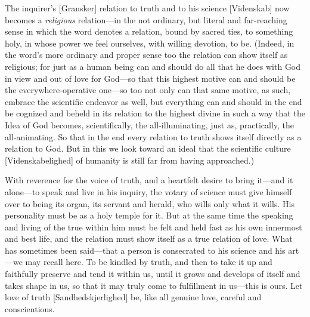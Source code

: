 \documentclass[12pt,a4paper]{book}
\begin{document}
The inquirer's [Gransker] relation to truth and to his science [Videnskab] now
becomes a \emph{religious} relation---in the not ordinary, but literal and
far-reaching sense in which the word denotes a relation, bound by sacred ties,
to something holy, in whose power we feel ourselves, with willing devotion, to
be. (Indeed, in the word's more ordinary and proper sense too the relation can
show itself as religious; for just as a human being can and should do all that
he does with God in view and out of love for God---so that this highest motive
can and should be the everywhere-operative one---so too not only can that same
motive, as such, embrace the scientific endeavor as well, but everything can and
should in the end be cognized and beheld in its relation to the highest divine
in such a way that the Idea of God becomes, scientifically, the all-illuminating,
just as, practically, the all-animating. So that in the end every relation to
truth shows itself directly as a relation to God. But in this we look toward an
ideal that the scientific culture [Videnskabelighed] of humanity is still far
from having approached.)

With reverence for the voice of truth, and a heartfelt
desire to bring it---and it alone---to speak and live in his inquiry, the votary
of science must give himself over to being its organ, its servant and herald,
who wills only what it wills. His personality must be as a holy temple for it.
But at the same time the speaking and living of the true within him must be felt
and held fast as his own innermost and best life, and the relation must show
itself as a true relation of love. What has sometimes been said---that a person
is consecrated to his science and his art---we may recall here. To be kindled by
truth, and then to take it up and faithfully preserve and tend it within us,
until it grows and develops of itself and takes shape in us, so that it may
truly come to fulfillment in us---this is ours. Let love of truth
[Sandhedskjerlighed] be, like all genuine love, careful and conscientious.
\end{document}

